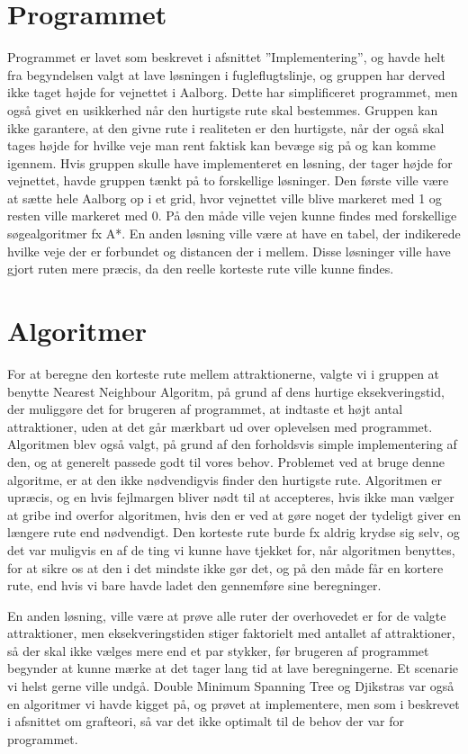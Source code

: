 \section{Programmet}
Programmet er lavet som beskrevet i afsnittet ”Implementering”, og havde helt fra begyndelsen valgt at lave løsningen i fugleflugtslinje, og gruppen har derved ikke taget højde for vejnettet i Aalborg. Dette har simplificeret programmet, men også givet en usikkerhed når den hurtigste rute skal bestemmes. Gruppen kan ikke garantere, at den givne rute i realiteten er den hurtigste, når der også skal tages højde for hvilke veje man rent faktisk kan bevæge sig på og kan komme igennem. 
Hvis gruppen skulle have implementeret en løsning, der tager højde for vejnettet, havde gruppen tænkt på to forskellige løsninger. Den første ville være at sætte hele Aalborg op i et grid, hvor vejnettet ville blive markeret med 1 og resten ville markeret med 0. På den måde ville vejen kunne findes med forskellige søgealgoritmer fx A*. En anden løsning ville være at have en tabel, der indikerede hvilke veje der er forbundet og distancen der i mellem. Disse løsninger ville have gjort ruten mere præcis, da den reelle korteste rute ville kunne findes. 
\section{Algoritmer}
For at beregne den korteste rute mellem attraktionerne, valgte vi i gruppen at benytte Nearest Neighbour Algoritm, på grund af dens hurtige eksekveringstid, der muliggøre det for brugeren af programmet, at indtaste et højt antal attraktioner, uden at det går mærkbart ud over oplevelsen med programmet. Algoritmen blev også valgt, på grund af den forholdsvis simple implementering af den, og at generelt passede godt til vores behov. Problemet ved at bruge denne algoritme, er at den ikke nødvendigvis finder den hurtigste rute. Algoritmen er upræcis, og en hvis fejlmargen bliver nødt til at accepteres, hvis ikke man vælger at gribe ind overfor algoritmen, hvis den er ved at gøre noget der tydeligt giver en længere rute end nødvendigt. Den korteste rute burde fx aldrig krydse sig selv, og det var muligvis en af de ting vi kunne have tjekket for, når algoritmen benyttes, for at sikre os at den i det mindste ikke gør det, og på den måde får en kortere rute, end hvis vi bare havde ladet den gennemføre sine beregninger. 

En anden løsning, ville være at prøve alle ruter der overhovedet er for de valgte attraktioner, men eksekveringstiden stiger faktorielt med antallet af attraktioner, så der skal ikke vælges mere end et par stykker, før brugeren af programmet begynder at kunne mærke at det tager lang tid at lave beregningerne. Et scenarie vi helst gerne ville undgå.
Double Minimum Spanning Tree og Djikstras var også en algoritmer vi havde kigget på, og prøvet at implementere, men som i beskrevet i afsnittet om grafteori, så var det ikke optimalt til de behov der var for programmet. 

